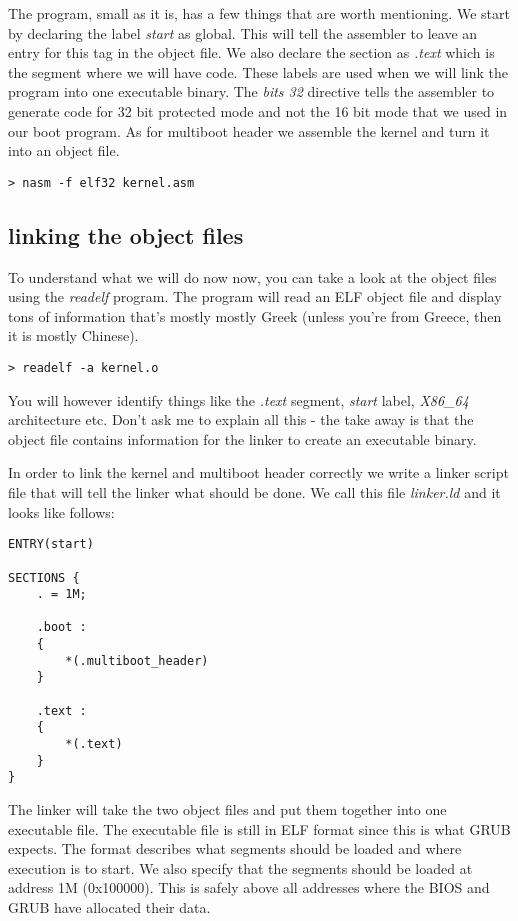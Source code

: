 \documentclass[a4paper,11pt]{article}
\begin{document}
The program, small as it is, has a few things that are worth
mentioning. We start by declaring the label {\em start} as
global. This will tell the assembler to leave an entry for this tag in
the object file. We also declare the section as {\em .text} which is
the segment where we will have code. These labels are used when we
will link the program into one executable binary. The {\em bits 32}
directive tells the assembler to generate code for 32 bit protected
mode and not the 16 bit mode that we used in our boot program. As for
multiboot header we assemble the kernel and turn it into an object
file.

\begin{verbatim}
> nasm -f elf32 kernel.asm
\end{verbatim}

\subsection{linking the object files}

To understand what we will do now now, you can take a look at the
object files using the {\em readelf} program. The program will read an
ELF object file and display tons of information that's mostly
mostly Greek (unless you're from Greece, then it is
mostly Chinese).

\begin{verbatim}
> readelf -a kernel.o
\end{verbatim}
 
You will however identify things like the {\em .text} segment, {\em
  start} label, {\em X86\_64} architecture etc. Don't ask me to explain
all this - the take away is that the object file contains information
for the linker to create an executable binary.

In order to link the kernel and multiboot header correctly we write a
linker script file that will tell the linker what should be done. We
call this file {\em linker.ld} and it looks like follows:

\begin{verbatim}
ENTRY(start)

SECTIONS {
    . = 1M;

    .boot :
    {
        *(.multiboot_header)
    }

    .text :
    {
        *(.text)
    }
}
\end{verbatim}

The linker will take the two object files and put them together into
one executable file. The executable file is still in ELF format since
this is what GRUB expects. The format describes what segments should
be loaded and where execution is to start. We also specify that the
segments should be loaded at address 1M (0x100000). This is safely
above all addresses where the BIOS and GRUB have allocated their data.
\end{document}
